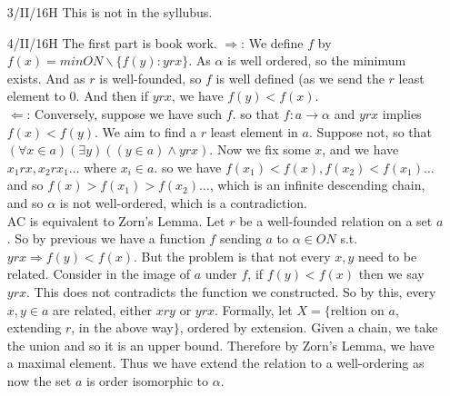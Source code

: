 \begin{enumerate}
\item[3/II/16H] This is not in the syllubus.\\
\item[4/II/16H] The first part is book work.
     $\Rightarrow$: We define $f$ by $f(x)=min ON \backslash\{f(y): y r x\}$. As $\alpha$ is well ordered, so the minimum exists. And as $r$ is well-founded, so $f$ is well defined (as we send the $r$ least element to $0$. And then if $y r x$, we have $f(y) < f(x)$.\\
     $\Leftarrow$: Conversely, suppose we have such $f$. so that $f: a \rightarrow \alpha$ and $y r x$ implies $f(x)<f(y)$. We aim to find a $r$ least element in $a$. Suppose not, so that $(\forall x \in a)(\exists y)((y \in a) \wedge y r x)$. Now we fix some $x$, and we have $x_1 r x, x_2 r x_1 \ldots$ where $x_i \in a$. so we have $f(x_1)<f(x), f(x_2)<f(x_1) \ldots$ and so $f(x)>f(x_1)>f(x_2) \ldots$, which is an infinite descending chain, and so $\alpha$ is not well-ordered, which is a contradiction.\\
     AC is equivalent to Zorn's Lemma. Let $r$ be a well-founded relation on a set $a$. So by previous we have a function $f$ sending $a$ to $\alpha \in ON$ s.t. $y r x \Rightarrow f(y)<f(x)$. But the problem is that not every $x,y$ need to be related. Consider in the image of $a$ under $f$, if $f(y) < f(x)$ then we say $y r x$. This does not contradicts the function we constructed. So by this, every $x,y \in a$ are related, either $x r y$ or $y r x$. Formally, let $X=\{$reltion on $a$, extending $r$, in the above way$\}$, ordered by extension. Given a chain, we take the union and so it is an upper bound. Therefore by Zorn's Lemma, we have a maximal  element. Thus we have extend the relation to a well-ordering as now the set $a$ is order isomorphic to $\alpha$.
\end{enumerate}
